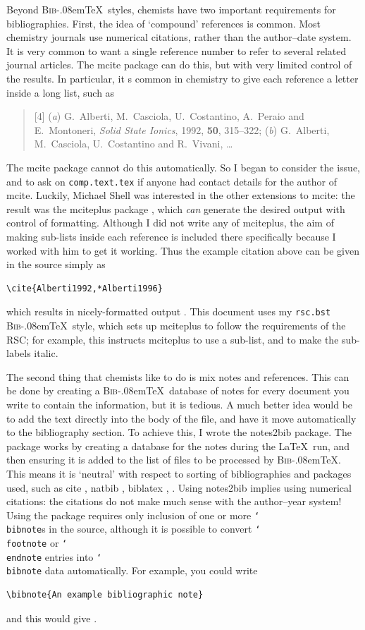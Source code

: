 \documentclass{article}
\providecommand*\acro[1]{\textsc{#1}}
\providecommand*\BibTeX{\acro{Bib}\kern-.08em\relax\TeX}
\providecommand*\cs[1]{\texttt{\char`\\#1}}
\providecommand*\file[1]{\texttt{#1}}
\providecommand*\pkg[1]{\textsf{#1}}
\begin{document}
Beyond \BibTeX\ styles, chemists have two important
requirements for bibliographies.  First, the idea of
`compound' references is common.  Most chemistry journals use
numerical citations, rather than the author--date system.
It is very common to want a single reference number to refer to
several related journal articles.  The \pkg{mcite} package
\cite{Ohl2005} can do this, but with very limited control of
the results. In particular, it s common in chemistry to give
each reference a letter inside a long list, such as
\begin{quote}
  [4] (\emph{a}) G.~Alberti, M.~Casciola, U.~Costantino,
  A.~Peraio and E.~Montoneri, \emph{Solid State Ionics}, 1992,
  \textbf{50}, 315--322; (\emph{b}) G.~Alberti, M.~Casciola,
  U.~Costantino and R.~Vivani, \ldots
\end{quote}
The \pkg{mcite} package cannot do this automatically.  So I
began to consider the issue, and to ask on
\texttt{comp.text.tex} if anyone had contact details for the
author of \pkg{mcite}. Luckily, Michael Shell was interested in
the other extensions to \pkg{mcite}: the result was the
\pkg{mciteplus} package \cite{Shell2008}, which \emph{can}
generate the desired output with control of formatting.
Although I did not write any of \pkg{mciteplus}, the aim of
making sub-lists inside each reference is included there
specifically because I worked with him to get it working. Thus
the example citation above can be given in the source simply as
\begin{verbatim}
\cite{Alberti1992,*Alberti1996}
\end{verbatim}
which results in nicely-formatted output
\cite{Alberti1992,*Alberti1996}.  This document uses my
\file{rsc.bst} \BibTeX\ style, which sets up \pkg{mciteplus}
to follow the requirements of the \acro{RSC}; for example, this
instructs \pkg{mciteplus} to use a sub-list, and to make the
sub-labels italic.

The second thing that chemists like to do is mix notes and
references.  This can be done by creating a \BibTeX\ database
of notes for every document you write to contain the
information, but it is tedious.  A much better idea would be to
add the text directly into the body of the file, and have it
move automatically to the bibliography section.  To achieve
this, I wrote the \pkg{notes2bib} package.  The package works
by creating a database for the notes during the \LaTeX\ run,
and then ensuring it is added to the list of files to be
processed by \BibTeX. This means it is `neutral' with respect
to sorting of bibliographies and packages used, such as
\pkg{cite} \cite{Arseneau2009}, \pkg{natbib} \cite{Daly2009},
\pkg{biblatex} \cite{Lehman2009}, \etc.  Using \pkg{notes2bib}
implies using numerical citations: the citations do not make
much sense with the author--year system!  Using the package
requires only inclusion of one or more \cs{bibnote}s in the
source, although it is possible to convert \cs{footnote} or
\cs{endnote} entries into \cs{bibnote} data automatically.  For
example, you could write
\begin{verbatim}
\bibnote{An example bibliographic note}
\end{verbatim}
and this would give .
\end{document}
